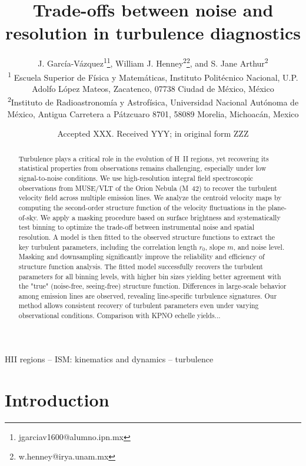 \documentclass[fleqn,usenatbib, useAMS, a4paper]{mnras}
\title[Turbulence diagnostic trade-offs]{Trade-offs between noise and resolution in turbulence diagnostics}
\author[J. García-Vázquez et al.]{
  J. García-Vázquez\textsuperscript{1}\thanks{jgarciav1600@alumno.ipn.mx},
  William J. Henney\textsuperscript{2}\thanks{w.henney@irya.unam.mx},
  and S. Jane Arthur\textsuperscript{2}
  \\
  \textsuperscript{1}\foreignlanguage{spanish}{%
    Escuela Superior de Física y Matemáticas, Instituto Politécnico Nacional, U.P. Adolfo López Mateos, Zacatenco, 07738 Ciudad de México, México}\\
  \textsuperscript{2}Instituto de Radioastronomía y Astrofísica,
    Universidad Nacional Autónoma de México,
    Antigua Carretera a Pátzcuaro 8701,
    58089 Morelia, Michoacán, Mexico\\
}
\date{Accepted XXX. Received YYY; in original form ZZZ}
\begin{document}
\label{firstpage}
\pagerange{\pageref{firstpage}--\pageref{lastpage}}
\maketitle

\begin{abstract}
  Turbulence plays a critical role in the evolution of H~II regions, yet recovering its statistical properties from observations remains challenging, especially under low signal-to-noise conditions.
  We use high-resolution integral field spectroscopic observations from MUSE/VLT of the Orion Nebula (M~42) to recover the turbulent velocity field across multiple emission lines.
  We analyze the centroid velocity maps by computing the second-order structure function of the velocity fluctuations in the plane-of-sky. We apply a masking procedure based on surface brightness and systematically test binning to optimize the trade-off between instrumental noise and spatial resolution. A model is then fitted to the observed structure functions to extract the key turbulent parameters, including the correlation length $r_0$, slope $m$, and noise level.
  Masking and downsampling significantly improve the reliability and efficiency of structure function analysis. The fitted model successfully recovers the turbulent parameters for all binning levels, with higher bin sizes yielding better agreement with the "true" (noise-free, seeing-free) structure function. Differences in large-scale behavior among emission lines are observed, revealing line-specific turbulence signatures. Our method allows consistent recovery of turbulent parameters even under varying observational conditions. Comparison with KPNO echelle yields...
\end{abstract}

\begin{keywords}
HII regions -- ISM: kinematics and dynamics -- turbulence 
\end{keywords}




\section{Introduction}
\end{document}
